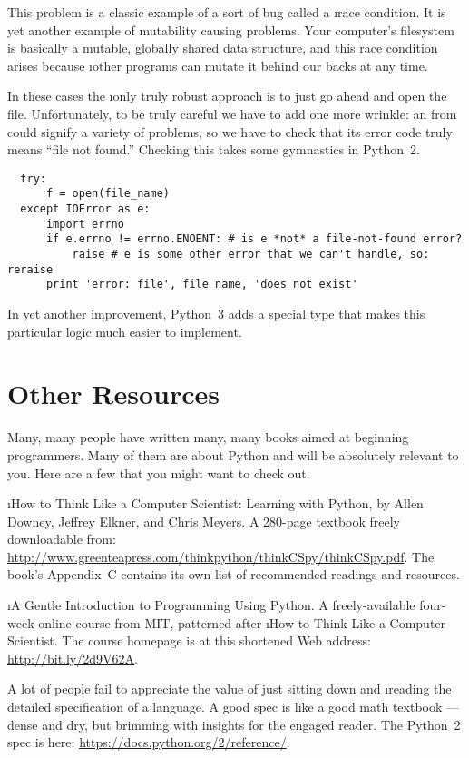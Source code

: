 \documentclass[letterpaper, 12pt, titlepage, twoside]{article}
\begin{document}
This problem is a classic example of a sort of bug called a \i{race
  condition}. It is yet another example of mutability causing problems. Your
computer's filesystem is basically a mutable, globally shared data structure,
and this race condition arises because \i{other programs} can mutate it behind
our backs at any time.

In these cases the \i{only} truly robust approach is to just go ahead and open
the file. Unfortunately, to be truly careful we have to add one more wrinkle:
an  from  could signify a variety of problems, so we have
to check that its error code truly means ``file not found.'' Checking this
takes some gymnastics in Python~2.

\begin{lstlisting}
  try:
      f = open(file_name)
  except IOError as e:
      import errno
      if e.errno != errno.ENOENT: # is e *not* a file-not-found error?
          raise # e is some other error that we can't handle, so: reraise
      print 'error: file', file_name, 'does not exist'
\end{lstlisting}

In yet another improvement, Python~3 adds a special  type
that makes this particular logic much easier to implement.



\newpage
\section*{Other Resources}

Many, many people have written many, many books aimed at beginning
programmers. Many of them are about Python and will be absolutely relevant to
you. Here are a few that you might want to check out.

\i{How to Think Like a Computer Scientist: Learning with Python}, by Allen
Downey, Jeffrey Elkner, and Chris Meyers. A 280-page textbook freely
downloadable from:
\url{http://www.greenteapress.com/thinkpython/thinkCSpy/thinkCSpy.pdf}. The
book's Appendix~C contains its own list of recommended readings and resources.

\i{A Gentle Introduction to Programming Using Python}. A freely-available
four-week online course from MIT, patterned after \i{How to Think Like a
  Computer Scientist}. The course homepage is at this shortened Web address:
\url{http://bit.ly/2d9V62A}.

A lot of people fail to appreciate the value of just sitting down and
\i{reading the detailed specification} of a language. A good spec is like a
good math textbook --- dense and dry, but brimming with insights for the
engaged reader. The Python~2 spec is here:
\url{https://docs.python.org/2/reference/}.
\end{document}
